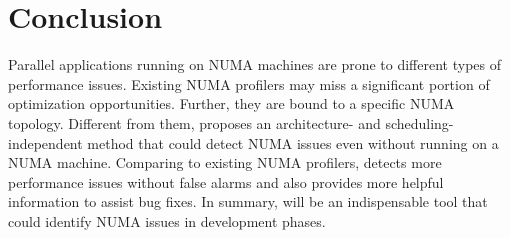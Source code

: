 \section{Conclusion}
\label{sec:conclusion}

Parallel applications running on NUMA machines are prone to different types of performance issues. Existing NUMA profilers may miss a significant portion of optimization opportunities. Further, they are bound to a specific NUMA topology. Different from them, \NP{} proposes an architecture- and scheduling-independent method that could detect NUMA issues even without running on a NUMA machine. Comparing to existing NUMA profilers, \NP{} detects more performance issues without false alarms and also provides more helpful information to assist bug fixes. In summary, \NP{} will be an indispensable tool that could identify NUMA issues in development phases. 


